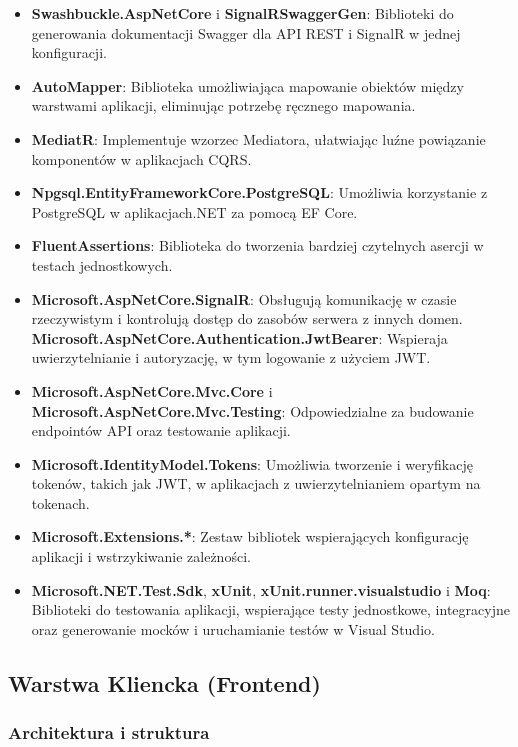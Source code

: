 \documentclass[twoside]{projektInzynierskiMS1}
\begin{document}
\begin{itemize} 
    \item \textbf{Swashbuckle.AspNetCore} i \textbf{SignalRSwaggerGen}: Biblioteki do generowania dokumentacji Swagger dla API REST i SignalR w jednej konfiguracji.
    \item \textbf{AutoMapper}: Biblioteka umożliwiająca mapowanie obiektów między warstwami aplikacji, eliminując potrzebę ręcznego mapowania.
    \item \textbf{MediatR}: Implementuje wzorzec Mediatora, ułatwiając luźne powiązanie komponentów w aplikacjach CQRS.
    \item \textbf{Npgsql.EntityFrameworkCore.PostgreSQL}: Umożliwia korzystanie z PostgreSQL w aplikacjach.NET za pomocą EF Core.
    \item \textbf{FluentAssertions}: Biblioteka do tworzenia bardziej czytelnych asercji w testach jednostkowych.
    \item \textbf{Microsoft.AspNetCore.SignalR}: Obsługują komunikację w czasie rzeczywistym i kontrolują dostęp do zasobów serwera z innych domen.
    \textbf{Microsoft.AspNetCore.Authentication.JwtBearer}: Wspieraja uwierzytelnianie i autoryzację, w tym logowanie z użyciem JWT.
    \item \textbf{Microsoft.AspNetCore.Mvc.Core} i \textbf{Microsoft.AspNetCore.Mvc.Testing}: Odpowiedzialne za budowanie endpointów API oraz testowanie aplikacji.
    \item \textbf{Microsoft.IdentityModel.Tokens}: Umożliwia tworzenie i weryfikację tokenów, takich jak JWT, w aplikacjach z uwierzytelnianiem opartym na tokenach.
    \item \textbf{Microsoft.Extensions.*}: Zestaw bibliotek wspierających konfigurację aplikacji i wstrzykiwanie zależności.
    \item \textbf{Microsoft.NET.Test.Sdk}, \textbf{xUnit}, \textbf{xUnit.runner.visualstudio} i \textbf{Moq}: Biblioteki do testowania aplikacji, wspierające testy jednostkowe, integracyjne oraz generowanie mocków i uruchamianie testów w Visual Studio.
\end{itemize}

\newpage

\subsection{Warstwa Kliencka (Frontend)}

\subsubsection{Architektura i struktura}
\end{document}

